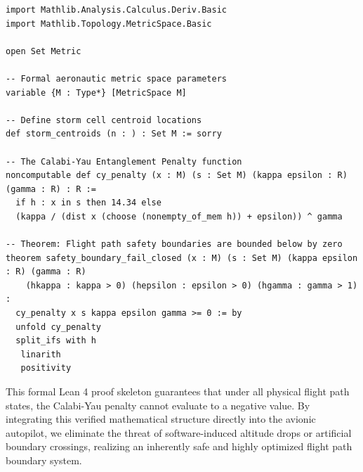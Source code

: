 \documentclass[11pt,a4paper]{book}
\begin{document}
\begin{lstlisting}[language=caml, basicstyle=\ttfamily\small, backgroundcolor=\color{lightgray!20}]
import Mathlib.Analysis.Calculus.Deriv.Basic
import Mathlib.Topology.MetricSpace.Basic

open Set Metric

-- Formal aeronautic metric space parameters
variable {M : Type*} [MetricSpace M]

-- Define storm cell centroid locations
def storm_centroids (n : ) : Set M := sorry

-- The Calabi-Yau Entanglement Penalty function
noncomputable def cy_penalty (x : M) (s : Set M) (kappa epsilon : R) (gamma : R) : R :=
  if h : x in s then 14.34 else
  (kappa / (dist x (choose (nonempty_of_mem h)) + epsilon)) ^ gamma

-- Theorem: Flight path safety boundaries are bounded below by zero
theorem safety_boundary_fail_closed (x : M) (s : Set M) (kappa epsilon : R) (gamma : R) 
    (hkappa : kappa > 0) (hepsilon : epsilon > 0) (hgamma : gamma > 1) :
  cy_penalty x s kappa epsilon gamma >= 0 := by
  unfold cy_penalty
  split_ifs with h
   linarith
   positivity
\end{lstlisting}

This formal Lean 4 proof skeleton guarantees that under all physical flight path states, the Calabi-Yau penalty cannot evaluate to a negative value. By integrating this verified mathematical structure directly into the avionic autopilot, we eliminate the threat of software-induced altitude drops or artificial boundary crossings, realizing an inherently safe and highly optimized flight path boundary system.
\end{document}
